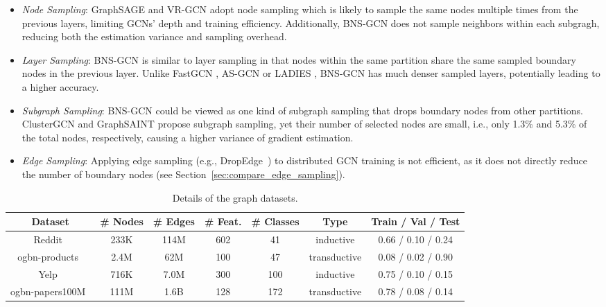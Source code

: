 \documentclass{article}
\begin{document}
\begin{itemize}
    \item  \textit{Node Sampling}: GraphSAGE \citep{hamilton2017inductive} and VR-GCN \citep{chen2018stochastic} adopt node sampling which is likely to sample the same nodes multiple times from the previous layers, limiting GCNs' depth and training efficiency. 
Additionally, BNS-GCN does not sample neighbors within each subgragh, reducing both the estimation variance and sampling overhead.

\item \textit{Layer Sampling}: BNS-GCN is similar to layer sampling in that nodes within the same partition share the same sampled boundary nodes in the previous layer. 
Unlike FastGCN \citep{chen2018fastgcn}, AS-GCN \citep{huang2018adaptive} or LADIES \citep{zou2019layer}, BNS-GCN has much denser sampled layers, potentially leading to a higher accuracy.

\item \textit{Subgraph Sampling}: BNS-GCN could be viewed as one kind of subgraph sampling that drops boundary nodes from other partitions.
ClusterGCN \citep{chiang2019cluster} and GraphSAINT \citep{zeng2019graphsaint} propose subgraph sampling, yet their number of selected nodes are small, i.e., only 1.3\% and 5.3\% of the total nodes, respectively, causing a higher variance of gradient estimation.

\item \textit{Edge Sampling}: Applying edge sampling (e.g., DropEdge~\citep{rong2019dropedge}) to distributed GCN training is not efficient, as it does not directly reduce the number of boundary nodes (see Section~\ref{sec:compare_edge_sampling}). 
\end{itemize}

\begin{table*}[t]
\centering
\caption{Details of the graph datasets.}
\label{tab:setups}
\begin{tabular}{c|cccccc}
\hline
Dataset & \# Nodes & \# Edges & \# Feat. & \# Classes & Type & Train / Val / Test\\ \hline
Reddit~\citep{hamilton2017inductive} & 233K & 114M & 602 & 41 & inductive & 0.66 / 0.10 / 0.24 \\
ogbn-products~\citep{hu2020open}& 2.4M & 62M  & 100 & 47 & transductive & 0.08 / 0.02 / 0.90 \\
Yelp~\citep{zeng2019graphsaint} & 716K & 7.0M & 300 & 100 & inductive & 0.75 / 0.10 / 0.15 \\
ogbn-papers100M~\citep{hu2020open}& 111M & 1.6B & 128 & 172 & transductive & 0.78 / 0.08 / 0.14  \\ \hline
\end{tabular}
\end{table*}
 
\end{document}
